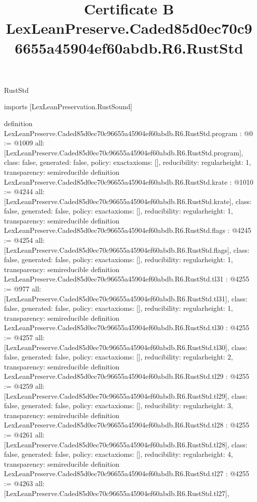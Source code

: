 \begin{lexlean}{RustStd}
\title{Certificate B LexLeanPreserve.Caded85d0ec70c96655a45904ef60abdb.R6.RustStd}
\begin{coremodule}
imports [LexLeanPreservation.RustSound]

definition LexLeanPreserve.Caded85d0ec70c96655a45904ef60abdb.R6.RustStd.program : @0 := @1009 {
  all: [LexLeanPreserve.Caded85d0ec70c96655a45904ef60abdb.R6.RustStd.program],
  class: false,
  generated: false,
  policy: exact{axioms: []},
  reducibility: regular{height: 1},
  transparency: semireducible
}
definition LexLeanPreserve.Caded85d0ec70c96655a45904ef60abdb.R6.RustStd.krate : @1010 := @4244 {
  all: [LexLeanPreserve.Caded85d0ec70c96655a45904ef60abdb.R6.RustStd.krate],
  class: false,
  generated: false,
  policy: exact{axioms: []},
  reducibility: regular{height: 1},
  transparency: semireducible
}
definition LexLeanPreserve.Caded85d0ec70c96655a45904ef60abdb.R6.RustStd.flags : @4245 := @4254 {
  all: [LexLeanPreserve.Caded85d0ec70c96655a45904ef60abdb.R6.RustStd.flags],
  class: false,
  generated: false,
  policy: exact{axioms: []},
  reducibility: regular{height: 1},
  transparency: semireducible
}
definition LexLeanPreserve.Caded85d0ec70c96655a45904ef60abdb.R6.RustStd.tl31 : @4255 := @977 {
  all: [LexLeanPreserve.Caded85d0ec70c96655a45904ef60abdb.R6.RustStd.tl31],
  class: false,
  generated: false,
  policy: exact{axioms: []},
  reducibility: regular{height: 1},
  transparency: semireducible
}
definition LexLeanPreserve.Caded85d0ec70c96655a45904ef60abdb.R6.RustStd.tl30 : @4255 := @4257 {
  all: [LexLeanPreserve.Caded85d0ec70c96655a45904ef60abdb.R6.RustStd.tl30],
  class: false,
  generated: false,
  policy: exact{axioms: []},
  reducibility: regular{height: 2},
  transparency: semireducible
}
definition LexLeanPreserve.Caded85d0ec70c96655a45904ef60abdb.R6.RustStd.tl29 : @4255 := @4259 {
  all: [LexLeanPreserve.Caded85d0ec70c96655a45904ef60abdb.R6.RustStd.tl29],
  class: false,
  generated: false,
  policy: exact{axioms: []},
  reducibility: regular{height: 3},
  transparency: semireducible
}
definition LexLeanPreserve.Caded85d0ec70c96655a45904ef60abdb.R6.RustStd.tl28 : @4255 := @4261 {
  all: [LexLeanPreserve.Caded85d0ec70c96655a45904ef60abdb.R6.RustStd.tl28],
  class: false,
  generated: false,
  policy: exact{axioms: []},
  reducibility: regular{height: 4},
  transparency: semireducible
}
definition LexLeanPreserve.Caded85d0ec70c96655a45904ef60abdb.R6.RustStd.tl27 : @4255 := @4263 {
  all: [LexLeanPreserve.Caded85d0ec70c96655a45904ef60abdb.R6.RustStd.tl27],
}
\end{coremodule}
\end{lexlean}

